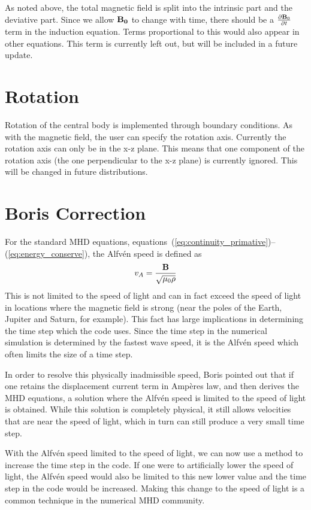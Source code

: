 As noted above, the total magnetic field is split into the intrinsic part 
and the deviative part.  Since we allow $\bf B_0$ to change with time, 
there should be a $\frac{\partial {\bf B}_0}{\partial t}$ term in the 
induction equation.  Terms proportional to this would also appear in
other equations.  This term is currently left out, but will be included
in a future update.


\section{Rotation \label{section:rotation}}
Rotation of the central body is implemented through boundary conditions.
As with the magnetic field, the user can specify the rotation axis.
Currently the rotation axis can only be in the x-z plane.  This means
that one component of the rotation axis (the one perpendicular to the
x-z plane) is currently ignored.  This will be changed 
in future distributions.

\section{Boris Correction \label{section:boris}}

For the standard MHD equations, equations~(\ref{eq:continuity_primative})--
(\ref{eq:energy_conserve}), the Alfv\'en speed is
defined as
\begin{equation}
v_A = \frac{\bf B}{\sqrt{\mu_0 \rho}}
\end{equation}
This is not limited to the speed of light and can in fact exceed the 
speed of light in locations where the magnetic field is strong (near the
poles of the  Earth, Jupiter and Saturn, for example).  This fact has large
implications in determining the time step which the code uses.  Since the 
time step in the numerical simulation is determined by the fastest wave speed, 
it is the Alfv\'en speed which often limits the size of a time step.

In order to resolve this physically inadmissible speed, Boris pointed out 
that if one retains
the displacement current term in Amp\`eres law, and then derives the
MHD equations, a solution where the Alfv\'en speed is
limited to the speed of light is obtained.  While this solution is completely 
physical, it still allows velocities that are near the speed of light,
which in turn can still produce a very small time step.  

With the Alfv\'en speed limited to the speed of light, we can now 
use a method to increase the time step in the code.  If one were
to artificially lower the speed of light, the Alfv\'en speed would
also be limited to this new lower value and the time step in the
code would be increased.
Making this change to the speed of light is a common technique in 
the numerical MHD community.

